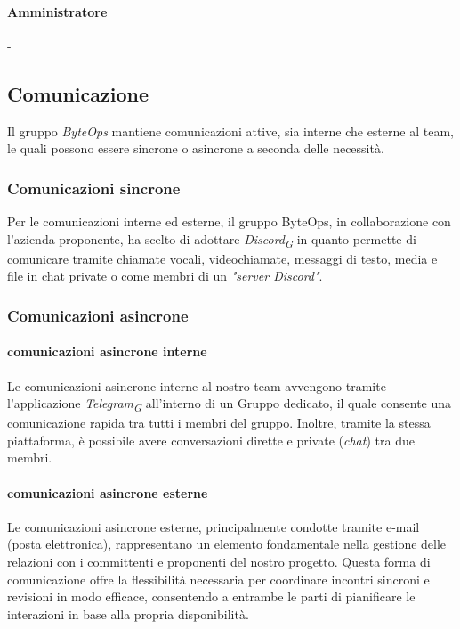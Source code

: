 \documentclass{article}
\begin{document}
    \paragraph{Amministratore} -         

    \subsection{Comunicazione}
    Il gruppo \textit{ByteOps} mantiene comunicazioni attive, sia interne che esterne al team, le quali possono essere sincrone o asincrone a seconda delle necessità.
    \subsubsection{Comunicazioni sincrone}
    Per le comunicazioni interne ed esterne, il gruppo ByteOps, in collaborazione con l'azienda proponente, ha scelto di adottare \textit{Discord}\textsubscript{\textit{G}} in quanto permette di comunicare tramite chiamate vocali, videochiamate, messaggi di testo, media e file in chat private o come membri di un \textit{"server Discord"}.
    \subsubsection{Comunicazioni asincrone}
        \paragraph{comunicazioni asincrone interne}
        Le comunicazioni asincrone interne al nostro team avvengono tramite l'applicazione \textit{Telegram}\textsubscript{\textit{G}} all'interno di un Gruppo dedicato, il quale consente una comunicazione rapida tra tutti i membri del gruppo. Inoltre, tramite la stessa piattaforma, è possibile avere conversazioni dirette e private (\textit{chat}) tra due membri.
        \paragraph{comunicazioni asincrone esterne}
        Le comunicazioni asincrone esterne, principalmente condotte tramite e-mail (posta elettronica), rappresentano un elemento fondamentale nella gestione delle relazioni con i committenti e proponenti del nostro progetto. Questa forma di comunicazione offre la flessibilità necessaria per coordinare incontri sincroni e revisioni in modo efficace, consentendo a entrambe le parti di pianificare le interazioni in base alla propria disponibilità. 
    
\end{document}
